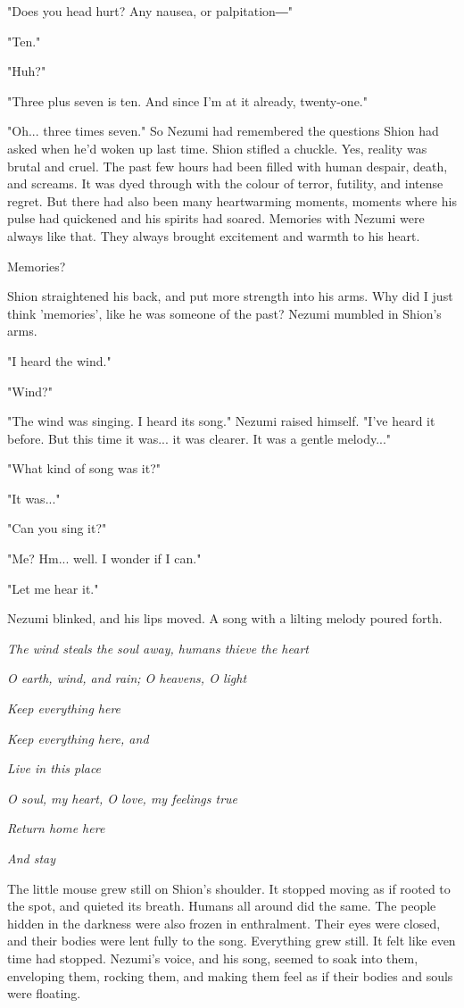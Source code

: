 "Does you head hurt? Any nausea, or palpitation―"

"Ten."

"Huh?"

"Three plus seven is ten. And since I'm at it already, twenty-one."

"Oh... three times seven." So Nezumi had remembered the questions Shion
had asked when he'd woken up last time. Shion stifled a chuckle. Yes,
reality was brutal and cruel. The past few hours had been filled with
human despair, death, and screams. It was dyed through with the colour
of terror, futility, and intense regret. But there had also been many
heartwarming moments, moments where his pulse had quickened and his
spirits had soared. Memories with Nezumi were always like that. They
always brought excitement and warmth to his heart.

Memories?

Shion straightened his back, and put more strength into his arms. Why
did I just think 'memories', like he was someone of the past? Nezumi
mumbled in Shion's arms.

"I heard the wind."

"Wind?"

"The wind was singing. I heard its song." Nezumi raised himself. "I've
heard it before. But this time it was... it was clearer. It was a gentle
melody..."

"What kind of song was it?"

"It was..."

"Can you sing it?"

"Me? Hm... well. I wonder if I can."

"Let me hear it."

Nezumi blinked, and his lips moved. A song with a lilting melody poured
forth.

\emph{The wind steals the soul away, humans thieve the heart}

\emph{O earth, wind, and rain; O heavens, O light}

\emph{Keep everything here}

\emph{Keep everything here, and}

\emph{Live in this place}

\emph{O soul, my heart, O love, my feelings true}

\emph{Return home here}

\emph{And stay}

The little mouse grew still on Shion's shoulder. It stopped moving as if
rooted to the spot, and quieted its breath. Humans all around did the
same. The people hidden in the darkness were also frozen in enthralment.
Their eyes were closed, and their bodies were lent fully to the song.
Everything grew still. It felt like even time had stopped. Nezumi's
voice, and his song, seemed to soak into them, enveloping them, rocking
them, and making them feel as if their bodies and souls were floating.

